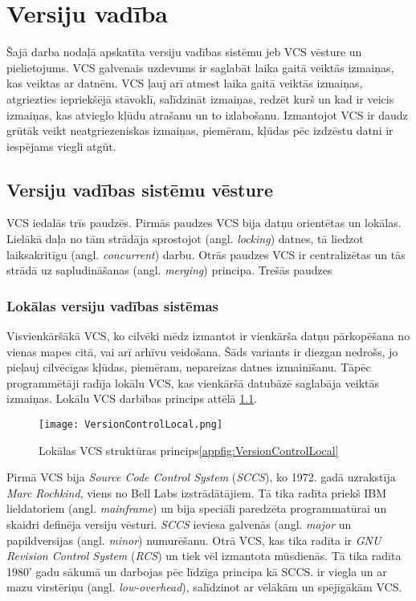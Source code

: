 \chapter{Versiju vadība}


Šajā darba nodaļā apskatīta versiju vadības sistēmu jeb VCS vēsture un pielietojums. VCS galvenais uzdevums ir saglabāt laika gaitā veiktās izmaiņas, kas veiktas ar datnēm. VCS ļauj arī atmest laika gaitā veiktās izmaiņas, atgriezties iepriekšējā stāvoklī, salīdzināt izmaiņas, redzēt kurš un kad ir veicis izmaiņas, kas atvieglo kļūdu atrašanu un to izlabošanu. Izmantojot VCS ir daudz grūtāk veikt neatgriezeniskas izmaiņas, piemēram, kļūdas pēc izdzēstu datni ir iespējams viegli atgūt.

\section{Versiju vadības sistēmu vēsture}
VCS iedalās trīs paudzēs. Pirmās paudzes VCS bija datņu orientētas un lokālas. Lielākā daļa no tām strādāja sprostojot (angl. \textit{locking}) datnes, tā liedzot laiksakritīgu (angl. \textit{concurrent}) darbu.
Otrās paudzes VCS ir centralizētas un tās strādā uz sapludināšanas (angl. \textit{merging}) principa.
Trešās paudzes
\cite[history]{raymondVCS}
\subsection{Lokālas versiju vadības sistēmas}
Visvienkāršākā VCS, ko cilvēki mēdz izmantot ir vienkārša datņu pārkopēšana no vienas mapes citā, vai arī arhīvu veidošana. Šāds variants ir diezgan nedrošs, jo pieļauj cilvēcīgas kļūdas, piemēram, nepareizas datnes izmainīšanu. Tāpēc programmētāji radīja lokālu VCS, kas vienkāršā datubāzē saglabāja veiktās izmaiņas. Lokālu VCS darbības princips attēlā \ref{fig:VersionControlLocal}.
\begin{figure}[H]%
	\centering
	\captionsetup{justification=centering}
	\texttt{[image: VersionControlLocal.png]}
	\caption{Lokālas VCS struktūras princips\ref{appfig:VersionControlLocal}}
	\label{fig:VersionControlLocal}
\end{figure}
Pirmā VCS bija \textit{Source Code Control System} (\textit{SCCS}), ko 1972. gadā uzrakstīja \textit{Marc Rochkind}, viens no Bell Labs izstrādātājiem. Tā tika radīta priekš IBM lieldatoriem (angl. \textit{mainframe}) un bija speciāli paredzēta programmatūrai un skaidri definēja versiju vēsturi. \textit{SCCS} ieviesa galvenās (angl. \textit{major} un papildversijas (angl. \textit{minor}) numurēšanu.
Otrā VCS, kas tika radīta ir \textit{GNU Revision Control System} (\textit{RCS}) un tiek vēl izmantota mūsdienās. Tā tika radīta 1980' gadu sākumā un darbojas pēc līdzīga principa kā SCCS.  ir viegla un ar mazu virstēriņu (angl. \textit{low-overhead}), salīdzinot ar vēlākām un spējīgākām VCS.

